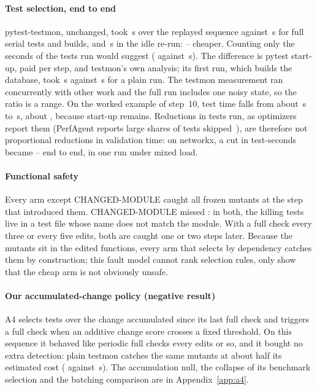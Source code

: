 \paragraph*{Test selection, end to end}
pytest-testmon, unchanged, took \TestmonMeasured\,s over the replayed sequence against \FullMeasured\,s for full serial tests and builds, and \FullIdle\,s in the idle re-run: \TestmonRatioLo--\TestmonRatioHi\x{} cheaper.
Counting only the seconds of the tests run would suggest \TestSecRatio\x{} (\TestmonTestSec{} against \FullTestSec\,s).
The difference is pytest start-up, paid per step, and testmon's own analysis; its first run, which builds the database, took \TestmonDB\,s against \TestmonDBPlain\,s for a plain run.
The testmon measurement ran concurrently with other work and the full run includes one noisy state, so the ratio is a range.
On the worked example of step~10, test time falls from about \WorkedTestsBefore\,s to \WorkedTestsAfter\,s, about \WorkedRatio\x, because start-up remains.
Reductions in tests run, as optimizers report them (PerfAgent reports large shares of tests skipped~\cite{deng2026perfagent}), are therefore not proportional reductions in validation time: on networkx, a \TestSecRatio\x{} cut in test-seconds became \TestmonRatioLo--\TestmonRatioHi\x{} end to end, in one run under mixed load.

\paragraph*{Functional safety}
Every arm except CHANGED-MODULE caught all \MutantsKilled{} frozen mutants at the step that introduced them.
CHANGED-MODULE missed \AThreeMissed: in both, the killing tests live in a test file whose name does not match the module.
With a full check every three or every five edits, both are caught one or two steps later.
Because the mutants sit in the edited functions, every arm that selects by dependency catches them by construction; this fault model cannot rank selection rules, only show that the cheap arm is not obviously unsafe.

\paragraph*{Our accumulated-change policy (negative result)}
A4 selects tests over the change accumulated since its last full check and triggers a full check when an additive change score crosses a fixed threshold.
On this sequence it behaved like periodic full checks every \AFourK{} edits or so, and it bought no extra detection: plain testmon catches the same mutants at about half its estimated cost (\EstTestmon{} against \EstAFour\,s).
The accumulation null, the collapse of its benchmark selection and the batching comparison are in Appendix~\ref{app:a4}.

